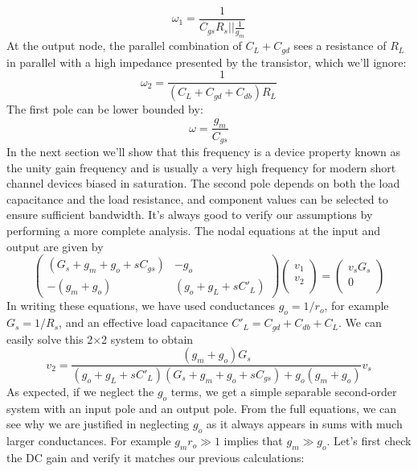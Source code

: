     \begin{equation}
        \omega_1 = \frac{1}{C_{gs} R_s||\frac{1}{g_m}}
    \end{equation}    
At the output node, the parallel combination of $C_L + C_{gd}$ sees a resistance of $R_L$ in parallel with a high impedance presented by the transistor, which we'll ignore:
    \begin{equation}
        \omega_2 = \frac{1}{(C_{L} + C_{gd} + C_{db}) R_L}
    \end{equation}    
The first pole can be lower bounded by:
    \begin{equation}
        \omega = \frac{g_m}{C_{gs}}
    \end{equation}
In the next section we'll show that this frequency is a device property known as the unity gain frequency and is usually a very high frequency for modern short channel devices biased in saturation.  The second pole depends on both the load capacitance and the load resistance, and component values can be selected to ensure sufficient bandwidth.
It's always good to verify our assumptions by performing a more complete analysis.  The nodal equations at the input and output are given by
    \begin{equation}
        \begin{pmatrix}
        (G_s + g_m + g_o + s C_{gs})  & - g_o\\
        -(g_m + g_o) & (g_o + g_L + s C'_L)
        \end{pmatrix}
        \begin{pmatrix}
        v_1\\v_2\\
        \end{pmatrix}
        =
        \begin{pmatrix}
        v_s G_s\\0\\
        \end{pmatrix}	
    \end{equation}
In writing these equations, we have used conductances $g_o = 1/r_o$, for example $G_s = 1/R_s$, and an effective load capacitance $C'_L = C_{gd} + C_{db} + C_L$.  We can easily solve this 2$\times$2 system to obtain
    \begin{equation}
        v_2 = \frac{(g_m + g_o) G_s}{(g_o + g_L + s C'_L)(G_s + g_m + g_o + s C_{gs}) + g_o (g_m + g_o)} v_s
    \end{equation}
As expected, if we neglect the $g_o$ terms, we get a simple separable second-order system with an input pole and an output pole.  From the full equations, we can see why we are justified in neglecting $g_o$ as it always appears in sums with much larger conductances.  For example $g_m r_o \gg 1$ implies that $g_m \gg g_o$.  Let's first check the DC gain and verify it matches our previous calculations:
